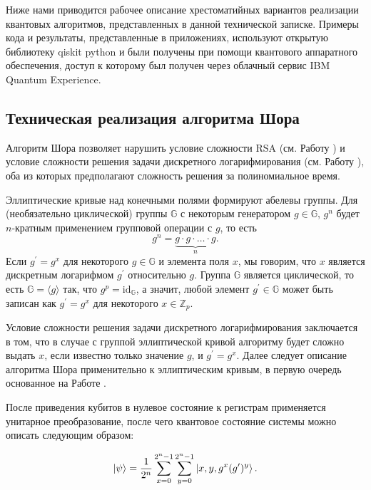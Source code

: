 \documentclass{mrl}
\begin{document}
Ниже нами приводится рабочее описание хрестоматийных вариантов реализации квантовых алгоритмов, представленных в данной технической записке. Примеры кода и результаты, представленные в приложениях, используют открытую библиотеку qiskit python и были получены при помощи квантового аппаратного обеспечения, доступ к которому был получен через облачный сервис IBM Quantum Experience. 

\subsection{Техническая реализация алгоритма Шора}\label{appsec:Shors}

Алгоритм Шора позволяет нарушить условие сложности RSA (см. Работу \cite{gerjuoy2005Shor}) и условие сложности решения задачи дискретного логарифмирования (см. Работу \cite{proos2003Shor}), оба из которых предполагают сложность решения за полиномиальное время.

Эллиптические кривые над конечными полями формируют абелевы группы. Для (необязательно циклической) группы $\mathbb{G}$ с некоторым генератором $g \in \mathbb{G}$, $g^n$ будет $n$-кратным применением групповой операции с $g$, то есть
\begin{equation}g^n = \underbrace{g \cdot g \cdot \ldots \cdot g}_{n}.\end{equation} 
Если $g^\prime = g^x$ для некоторого $g \in \mathbb{G}$ и элемента поля $x$, мы говорим, что $x$ является дискретным логарифмом $g^\prime$ относительно $g$. Группа $\mathbb{G}$ является циклической, то есть $\mathbb{G} = \langle g \rangle$ так, что $g^p = \text{id}_\mathbb{G}$, а значит, любой элемент $g^\prime \in \mathbb{G}$ может быть записан как $g^\prime = g^x$ для некоторого $x \in \mathbb{Z}_p.$

Условие сложности решения задачи дискретного логарифмирования заключается в том, что в случае с группой эллиптической кривой алгоритму будет сложно выдать $x$, если известно только значение $g$, и $g^\prime = g^x$. Далее следует описание алгоритма Шора применительно к эллиптическим кривым, в первую очередь основанное на Работе \cite{proos2003Shor}. 

После приведения кубитов в нулевое состояние к регистрам применяется унитарное преобразование, после чего квантовое состояние системы можно описать следующим образом:

\begin{equation}
    \ket{\psi} = \frac{1}{2^n} \sum^{2^n-1}_{x=0}\sum^{2^n-1}_{y=0}\ket{x,y,g^x(g^\prime)^y}.
\end{equation}
\end{document}
